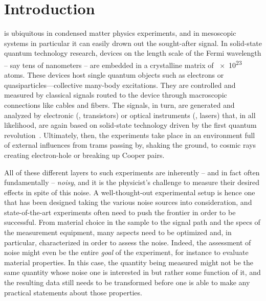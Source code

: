\chapter{Introduction}\label{ch:speck:introduction}
 is ubiquitous in condensed matter physics experiments, and in mesoscopic systems in particular it can easily drown out the sought-after signal.
In solid-state quantum technology research, devices on the length scale of the Fermi wavelength -- say tens of nanometers -- are embedded in a crystalline matrix of \num{e23} atoms.
These devices host single quantum objects such as electrons or quasiparticles---collective many-body excitations.
They are controlled and measured by classical signals routed to the device through macroscopic connections like cables and fibers.
The signals, in turn, are generated and analyzed by electronic (\eg, transistors) or optical instruments (\eg, lasers) that, in all likelihood, are again based on solid-state technology driven by the first quantum revolution~\cite{Dowling2003,Aspect2024}.
Ultimately, then, the experiments take place in an environment full of external influences from trams passing by, shaking the ground, to cosmic rays creating electron-hole or breaking up Cooper pairs.

All of these different layers to such experiments are inherently -- and in fact often fundamentally
-- \emph{noisy}, and it is the physicist's challenge to measure their desired effects in spite of this noise.
A well-thought-out experimental setup is hence one that has been designed taking the various noise sources into consideration, and state-of-the-art experiments often need to push the frontier in order to be successful.
From material choice in the sample to the signal path and the specs of the measurement equipment, many aspects need to be optimized and, in particular, characterized in order to assess the noise.
Indeed, the assessment of noise might even be the entire \emph{goal} of the experiment, for instance to evaluate material properties.
In this case, the quantity being measured might not be the same quantity whose noise one is interested in but rather some function of it, and the resulting data still needs to be transformed before one is able to make any practical statements about those properties.

